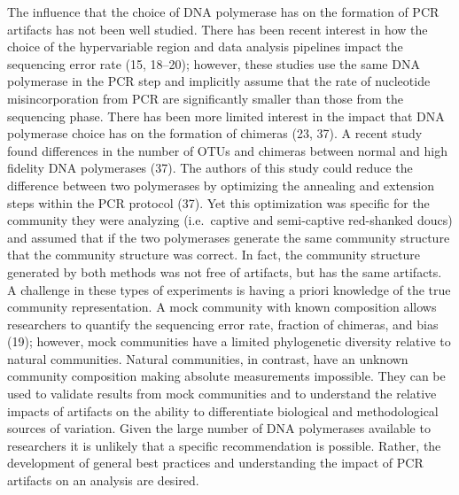 \documentclass[11,]{article}
\begin{document}
The influence that the choice of DNA polymerase has on the formation of
PCR artifacts has not been well studied. There has been recent interest
in how the choice of the hypervariable region and data analysis
pipelines impact the sequencing error rate (15, 18--20); however, these
studies use the same DNA polymerase in the PCR step and implicitly
assume that the rate of nucleotide misincorporation from PCR are
significantly smaller than those from the sequencing phase. There has
been more limited interest in the impact that DNA polymerase choice has
on the formation of chimeras (23, 37). A recent study found differences
in the number of OTUs and chimeras between normal and high fidelity DNA
polymerases (37). The authors of this study could reduce the difference
between two polymerases by optimizing the annealing and extension steps
within the PCR protocol (37). Yet this optimization was specific for the
community they were analyzing (i.e.~captive and semi-captive red-shanked
doucs) and assumed that if the two polymerases generate the same
community structure that the community structure was correct. In fact,
the community structure generated by both methods was not free of
artifacts, but has the same artifacts. A challenge in these types of
experiments is having a priori knowledge of the true community
representation. A mock community with known composition allows
researchers to quantify the sequencing error rate, fraction of chimeras,
and bias (19); however, mock communities have a limited phylogenetic
diversity relative to natural communities. Natural communities, in
contrast, have an unknown community composition making absolute
measurements impossible. They can be used to validate results from mock
communities and to understand the relative impacts of artifacts on the
ability to differentiate biological and methodological sources of
variation. Given the large number of DNA polymerases available to
researchers it is unlikely that a specific recommendation is possible.
Rather, the development of general best practices and understanding the
impact of PCR artifacts on an analysis are desired.
\end{document}
